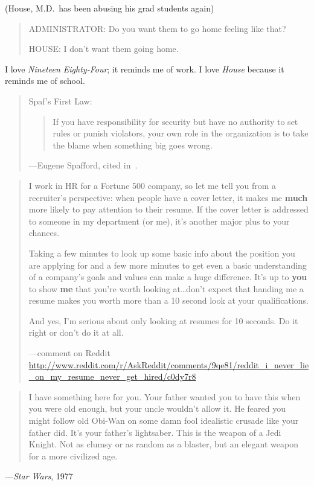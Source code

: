 \documentclass[a4paper]{article}
\begin{document}
\medskip
(House, M.D.\ has been abusing his grad students again)
\begin{quote}
	ADMINISTRATOR: Do you want them to go home feeling like that?

	HOUSE: I don't want them going home.
\end{quote}
I love {\it Nineteen Eighty-Four}; it reminds me of work.  I love
{\it House} because it reminds me of school.

\medskip
\begin{quote}
	Spaf's First Law:

	\begin{quotation}
		If you have responsibility for security but have no authority
		to set rules or punish violators, your own role in the
		organization is to take the blame when something big goes wrong.
	\end{quotation}
	---Eugene Spafford, cited in~\citep{Spafford2009}.
\end{quote}

\medskip
\begin{quote}
	I work in HR for a Fortune 500 company, so let me tell you from
	a recruiter's perspective: when people have a cover letter, it
	makes me {\bf much} more likely to pay attention to their resume. If
	the cover letter is addressed to someone in my department (or me),
	it's another major plus to your chances.

	Taking a few minutes to look up some basic info about the position
	you are applying for and a few more minutes to get even a basic
	understanding of a company's goals and values can make a huge
	difference. It's up to {\bf you} to show {\bf me} that you're worth
	looking at\ldots don't expect that handing me a resume makes you
	worth more than a 10 second look at your qualifications.

	And yes, I'm serious about only looking at resumes for 10 seconds.
	Do it right or don't do it at all.

	---comment on Reddit \url{http://www.reddit.com/r/AskReddit/comments/9qe81/reddit_i_never_lie_on_my_resume_never_get_hired/c0dy7r8}
\end{quote}

\medskip
\begin{quote}
	I have something here for you. Your father wanted you to have this
	when you were old enough, but your uncle wouldn't allow it. He
	feared you might follow old Obi-Wan on some damn fool idealistic
	crusade like your father did. It's your father's lightsaber. This
	is the weapon of a Jedi Knight. Not as clumsy or as random as
	a blaster, but an elegant weapon for a more civilized age.
\end{quote}
---{\it Star Wars}, 1977
\end{document}
